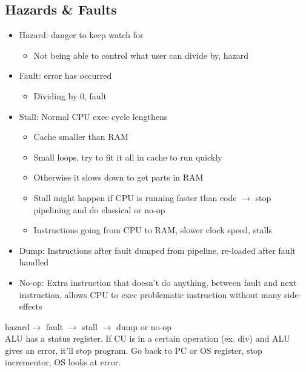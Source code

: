 \documentclass[12 pt]{article}
\begin{document}
	 \subsection{Hazards \& Faults}
	 \begin{itemize}
	 \item Hazard: danger to keep watch for
	 \begin{itemize}
	 \item Not being able to control what user can divide by, hazard
\end{itemize}
	 \item Fault: error has occurred
	 \begin{itemize}
	 \item Dividing by 0, fault
\end{itemize}
	 \item Stall: Normal CPU exec cycle lengthens
	 \begin{itemize}
	 \item Cache smaller than RAM
	 \item Small loops, try to fit it all in cache to run quickly
	 \item Otherwise it slows down to get parts in RAM
	 \item Stall might happen if CPU is running faster than code $\to$ stop pipelining and do classical or no-op
	 \item Instructions going from CPU to RAM, slower clock speed, stalls
\end{itemize}
	 \item Dump: Instructions after fault dumped from pipeline, re-loaded after fault handled
	 \item No-op: Extra instruction that doesn't do anything, between fault and next instruction, allows CPU to exec problematic instruction without many side-effects
\end{itemize}
hazard$\to$ fault $\to$ stall $\to$ dump or no-op
\\ ALU has a status register. If CU is in a certain operation (ex. div) and ALU gives an error, it'll stop program. Go back to PC or OS register, stop incrementor, OS looks at error.
\end{document}
